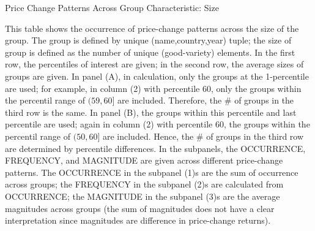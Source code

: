\begin{table}
	\caption{Price Change Patterns Across Group Characteristic: Size}\label{tbl:size}
	{
		\footnotesize This table shows the occurrence of price-change patterns across the size of the group. The group is defined by unique (name,country,year) tuple; the size of group is defined as the number of unique (good-variety) elements. In the first row, the percentiles of interest are given; in the second row, the average sizes of groups are given. In panel (A), in calculation, only the groups at the 1-percentile are used; for example, in column (2) with percentile 60, only the groups within the percentil range of $ (59,60] $ are included. Therefore, the \# of groups in the third row is the same. In panel (B), the groups within this percentile and last percentile are used; again in column (2) with percentile 60, the groups within the percentil range of $ (50,60] $ are included. Hence, the \# of groups in the third row are determined by percentile differences. In the subpanels, the OCCURRENCE, FREQUENCY, and MAGNITUDE are given across different price-change patterns. The OCCURRENCE in the subpanel (1)s are the sum of occurrence across groups; the FREQUENCY in the subpanel (2)s are calculated from OCCURRENCE; the MAGNITUDE in the subpanel (3)s are the average magnitudes across groups (the sum of magnitudes does not have a clear interpretation since magnitudes are difference in price-change returns).
		
	}
\end{table}

